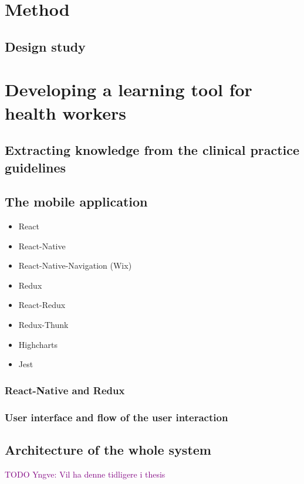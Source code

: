 \documentclass[a4paper,12pt]{book}
\begin{document}
\frontmatter


\tableofcontents
\mainmatter





\chapter{Method}
\section{Design study}




\chapter{Developing a learning tool for health workers}
\section{Extracting knowledge from the clinical  practice guidelines}







\section{The mobile application}
\begin{itemize}
	\item React
	\item React-Native
	\item React-Native-Navigation (Wix)
	\item Redux
	\item React-Redux
	\item Redux-Thunk
	\item Highcharts
	\item Jest
\end{itemize}
\subsection{React-Native and Redux}
\subsection{User interface and flow of the user interaction}
\section{Architecture of the whole system}
\textcolor{purple}{TODO Yngve: Vil ha denne tidligere i thesis}
\end{document}
